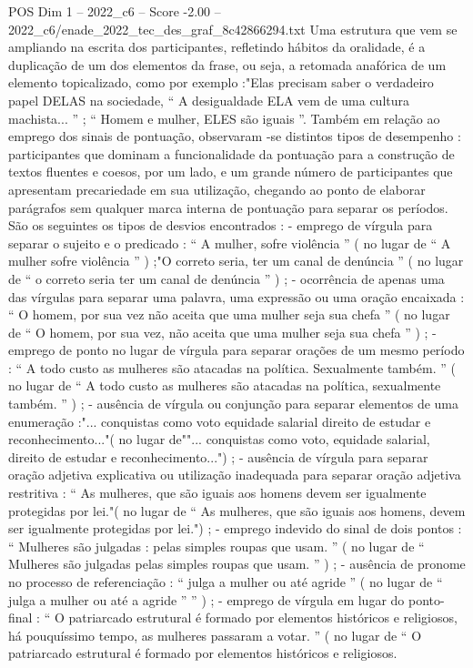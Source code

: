 \begin{textsample}{POS Dim 1 – 2022\_c6 – Score -2.00 – 2022\_c6/enade\_2022\_tec\_des\_graf\_8c42866294.txt}
Uma estrutura que vem se ampliando na escrita dos participantes, refletindo hábitos da oralidade, é a duplicação de um dos elementos da frase, ou seja, a retomada anafórica de um elemento topicalizado, como por exemplo :"Elas precisam saber o verdadeiro papel DELAS na sociedade, “ A desigualdade ELA vem de uma cultura machista... ” ; “ Homem e mulher, ELES são iguais ”.
Também em relação ao emprego dos sinais de pontuação, observaram -se distintos tipos de desempenho : participantes que dominam a funcionalidade da pontuação para a construção de textos fluentes e coesos, por um lado, e um grande número de participantes que apresentam precariedade em sua utilização, chegando ao ponto de elaborar parágrafos sem qualquer marca interna de pontuação para separar os períodos.
São os seguintes os tipos de desvios encontrados : - emprego de vírgula para separar o sujeito e o predicado : “ A mulher, sofre violência ” ( no lugar de “ A mulher sofre violência ” ) ;"O correto seria, ter um canal de denúncia ” ( no lugar de “ o correto seria ter um canal de denúncia ” ) ; - ocorrência de apenas uma das vírgulas para separar uma palavra, uma expressão ou uma oração encaixada : “ O homem, por sua vez não aceita que uma mulher seja sua chefa ” ( no lugar de “ O homem, por sua vez, não aceita que uma mulher seja sua chefa ” ) ; - emprego de ponto no lugar de vírgula para separar orações de um mesmo período : “ A todo custo as mulheres são atacadas na política.
Sexualmente também. ” ( no lugar de “ A todo custo as mulheres são atacadas na política, sexualmente também. ” ) ; - ausência de vírgula ou conjunção para separar elementos de uma enumeração :"... conquistas como voto equidade salarial direito de estudar e reconhecimento..."( no lugar de""... conquistas como voto, equidade salarial, direito de estudar e reconhecimento...") ; - ausência de vírgula para separar oração adjetiva explicativa ou utilização inadequada para separar oração adjetiva restritiva : “ As mulheres, que são iguais aos homens devem ser igualmente protegidas por lei."( no lugar de “ As mulheres, que são iguais aos homens, devem ser igualmente protegidas por lei.") ; - emprego indevido do sinal de dois pontos : “ Mulheres são julgadas : pelas simples roupas que usam. ” ( no lugar de “ Mulheres são julgadas pelas simples roupas que usam. ” ) ; - ausência de pronome no processo de referenciação : “ julga a mulher ou até agride ” ( no lugar de “ julga a mulher ou até a agride ” ” ) ; - emprego de vírgula em lugar do ponto-final : “ O patriarcado estrutural é formado por elementos históricos e religiosos, há pouquíssimo tempo, as mulheres passaram a votar. ” ( no lugar de “ O patriarcado estrutural é formado por elementos históricos e religiosos.

\end{textsample}
